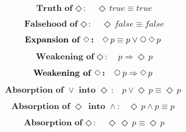 \documentclass[12pt, fleqn, leqno]{article}
\newcommand{\impl}{\ensuremath{\Rightarrow}}        %
\newcommand{\Next}{\;\,\text{\raisebox{3.5pt}{\circle{6}}}}
\newcommand{\Event}{\Diamond\,}
\newcommand{\spacer}{\vspace{-30pt}}
\begin{document}
\spacer

\begin{equation}\label{E:eventTrue}
\textbf{Truth of $\Event$:}\quad \Event true \equiv true
\end{equation}

\spacer

\begin{equation}\label{E:eventFalse}
\textbf{Falsehood of $\Event$:}\quad \Event false \equiv false
\end{equation}

\spacer

\begin{equation}\label{E:expansionEvent}
\textbf{Expansion of $\Event$:}\quad \Event p \equiv p \lor \Next\Event p
\end{equation}

\spacer

\begin{equation}\label{E:impEvent}
\textbf{Weakening of $\Event$:}\quad p \impl \Event p
\end{equation}

\spacer

\begin{equation}\label{E:nextEvent}
\textbf{Weakening of $\Event$:}\quad \Next p \impl \Event p
\end{equation}

\spacer

\begin{equation}\label{E:absOrIntoEvent}
\textbf{Absorption of $\lor$ into $\Event$:}\quad p \lor \Event p \equiv \Event p
\end{equation}

\spacer

\begin{equation}\label{E:absEventIntoAnd}
\textbf{Absorption of $\Event$ into $\land$:}\quad \Event p \land p \equiv p
\end{equation}

\spacer

\begin{equation}\label{E:IdemEvent}
\textbf{Absorption of $\Event$:}\quad \Event\Event p \equiv \Event p
\end{equation}
\end{document}
